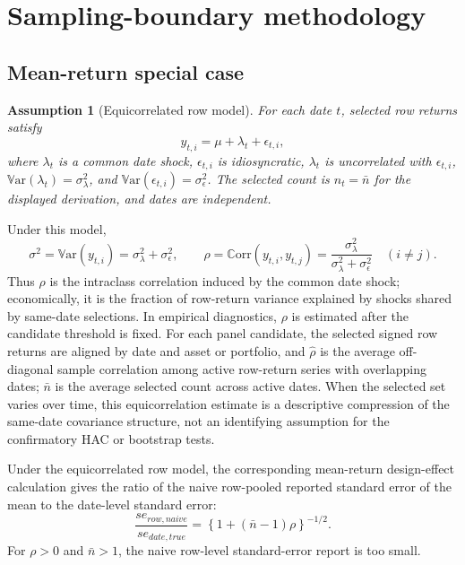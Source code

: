 \documentclass[12pt,a4paper]{article}
\newtheorem{assumption}{Assumption}
\newcommand{\Var}{\mathbb{V}\mathrm{ar}}
\newcommand{\Corr}{\mathbb{C}\mathrm{orr}}
\begin{document}
\section{Sampling-boundary methodology}

\subsection{Mean-return special case}
\label{sec:theory}

\begin{assumption}[Equicorrelated row model]
For each date \(t\), selected row returns satisfy
\[
  y_{t,i}=\mu+\lambda_t+\epsilon_{t,i},
\]
where \(\lambda_t\) is a common date shock, \(\epsilon_{t,i}\) is
idiosyncratic, \(\lambda_t\) is uncorrelated with \(\epsilon_{t,i}\),
\(\Var(\lambda_t)=\sigma_\lambda^2\), and
\(\Var(\epsilon_{t,i})=\sigma_\epsilon^2\).  The selected count is
\(n_t=\bar n\) for the displayed derivation, and dates are independent.
\end{assumption}

Under this model,
\[
  \sigma^2=\Var(y_{t,i})=\sigma_\lambda^2+\sigma_\epsilon^2,
  \qquad
  \rho=\Corr(y_{t,i},y_{t,j})
       =\frac{\sigma_\lambda^2}{\sigma_\lambda^2+\sigma_\epsilon^2}
       \quad (i\ne j).
\]
Thus \(\rho\) is the intraclass correlation induced by the common date
shock; economically, it is the fraction of row-return variance explained
by shocks shared by same-date selections.
In empirical diagnostics, \(\rho\) is estimated after the candidate
threshold is fixed.  For each panel candidate, the selected signed row
returns are aligned by date and asset or portfolio, and
\(\hat\rho\) is the average off-diagonal sample correlation among active
row-return series with overlapping dates; \(\bar n\) is the average
selected count across active dates.  When the selected set varies over
time, this equicorrelation estimate is a descriptive compression of the
same-date covariance structure, not an identifying assumption for the
confirmatory HAC or bootstrap tests.

Under the equicorrelated row model, the corresponding mean-return
design-effect calculation gives the ratio of the naive row-pooled
reported standard error of the mean to the date-level standard error:
\[
  \frac{se_{row,naive}}{se_{date,true}}
  =
  \left\{1+(\bar n-1)\rho\right\}^{-1/2}.
\]
For \(\rho>0\) and \(\bar n>1\), the naive row-level standard-error
report is too small.
\end{document}
